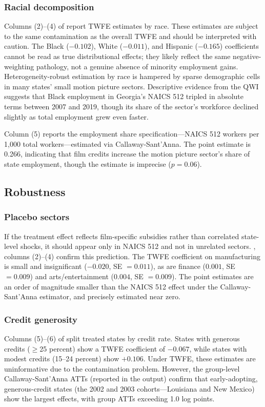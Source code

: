 \documentclass[12pt]{article}
\begin{document}
\subsubsection*{Racial decomposition} Columns (2)--(4) of  report TWFE estimates by race. These estimates are subject to the same contamination as the overall TWFE and should be interpreted with caution. The Black ($-0.102$), White ($-0.011$), and Hispanic ($-0.165$) coefficients cannot be read as true distributional effects; they likely reflect the same negative-weighting pathology, not a genuine absence of minority employment gains. Heterogeneity-robust estimation by race is hampered by sparse demographic cells in many states' small motion picture sectors. Descriptive evidence from the QWI suggests that Black employment in Georgia's NAICS 512 tripled in absolute terms between 2007 and 2019, though its share of the sector's workforce declined slightly as total employment grew even faster.

Column (5) reports the employment share specification---NAICS 512 workers per 1,000 total workers---estimated via Callaway-Sant'Anna. The point estimate is 0.266, indicating that film credits increase the motion picture sector's share of state employment, though the estimate is imprecise ($p = 0.06$).



\subsection{Robustness}



\subsubsection*{Placebo sectors} If the treatment effect reflects film-specific subsidies rather than correlated state-level shocks, it should appear only in NAICS 512 and not in unrelated sectors. , columns (2)--(4) confirm this prediction. The TWFE coefficient on manufacturing is small and insignificant ($-0.020$, SE $= 0.011$), as are finance ($0.001$, SE $= 0.009$) and arts/entertainment ($0.004$, SE $= 0.009$). The point estimates are an order of magnitude smaller than the NAICS 512 effect under the Callaway-Sant'Anna estimator, and precisely estimated near zero.

\subsubsection*{Credit generosity} Columns (5)--(6) of  split treated states by credit rate. States with generous credits ($\geq$25 percent) show a TWFE coefficient of $-0.067$, while states with modest credits (15--24 percent) show $+0.106$. Under TWFE, these estimates are uninformative due to the contamination problem. However, the group-level Callaway-Sant'Anna ATTs (reported in the output) confirm that early-adopting, generous-credit states (the 2002 and 2003 cohorts---Louisiana and New Mexico) show the largest effects, with group ATTs exceeding 1.0 log points.
\end{document}
